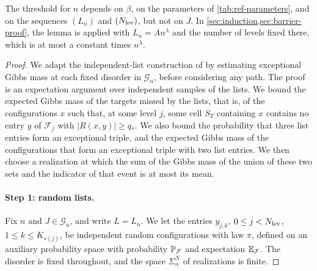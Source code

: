 The threshold for $n$ depends on $\beta$, on the parameters of
\cref{tab:ref-parameters}, and on the sequences $(L_n)$ and
$(N_{\rm lev})$, but not on $J$. In \cref{sec:induction,sec:barrier-proof},
the lemma is applied with $L_n=An^\lambda$ and the number of levels fixed
there, which is at most a constant times $n^\lambda$.

\begin{proof}
We adapt the independent-list construction of
\cite[Section~8.3]{oai-barriers} by estimating exceptional Gibbs mass at
each fixed disorder in $\mathcal G_n$, before considering any path.
The proof is an expectation argument over independent samples of the lists.
We bound the expected Gibbs mass of the targets missed by the lists, that is,
of the configurations $x$ such that, at some level $j$, some cell $S_T$
containing $x$ contains no entry $y$ of $\mathcal F_j$ with
$|R(x,y)|\ge q_*$. We also bound the probability that three list entries
form an exceptional triple, and the expected Gibbs mass of the configurations
that form an exceptional triple with two list entries. We then choose a realization at which the sum of the Gibbs mass of the union of these two sets and the indicator of that event is at most its mean.

\paragraph{Step 1: random lists.}
Fix $n$ and $J\in\mathcal G_n$, and write $L=L_n$. We let the entries
$y_{j,k}$, $0\le j<N_{\rm lev}$, $1\le k\le K_{s(j)}$, be independent random
configurations with law $\pi$, defined on an auxiliary probability space with
probability $\mathbb P_{\mathcal F}$ and expectation $\mathbb E_{\mathcal F}$. The
disorder is fixed throughout, and the space $\Sigma_n^N$ of realizations is
finite.


\end{proof}
